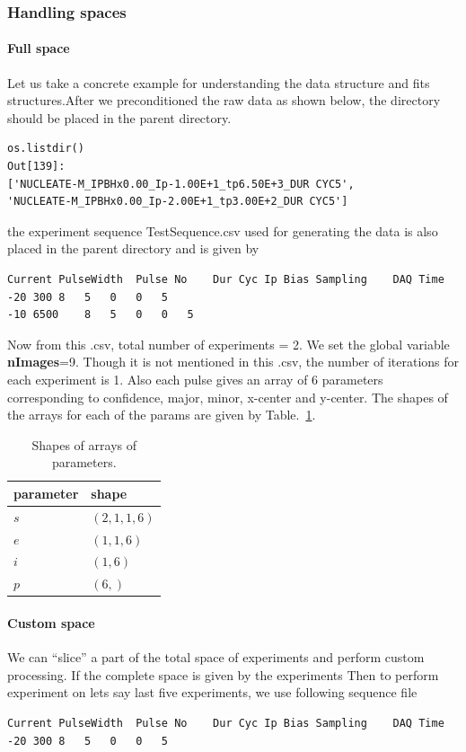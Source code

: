 \documentclass[12pt, twoside, a4paper]{article}
\begin{document}
\subsubsection{Handling spaces}
\paragraph{Full space}
Let us take a concrete example for understanding the data structure and fits structures.After we preconditioned the raw data as shown below, the directory should be placed in the parent directory.
%
\begin{verbatim}
os.listdir()
Out[139]: 
['NUCLEATE-M_IPBHx0.00_Ip-1.00E+1_tp6.50E+3_DUR CYC5',
'NUCLEATE-M_IPBHx0.00_Ip-2.00E+1_tp3.00E+2_DUR CYC5']
\end{verbatim}
%
the experiment sequence TestSequence.csv used for generating the data is also placed in the parent directory and is given by
\begin{verbatim}
Current	PulseWidth	Pulse No	Dur Cyc	Ip Bias	Sampling	DAQ Time
-20	300	8	5	0	0	5
-10	6500	8	5	0	0	5
\end{verbatim}
%
Now from this .csv, total number of experiments = 2. We set the global variable \textbf{nImages}=9. Though it is not mentioned in this .csv, the number of iterations for each experiment is 1. Also each pulse gives an array of 6 parameters corresponding to confidence, major, minor, x-center and y-center. The shapes of the arrays for each of the params are given by Table.~\ref{table: shape of arrays of parameters}.

%
\begin{table}[!htbp]
	\centering
	\begin{tabular}{ll}
		\hline\hline
		parameter	&	 shape	 \\
		\hline
		$s$		&	$(2,1,1,6)$	\\
		$e$		& 	$(1,1,6)$ 	\\
		$i$		&	$(1, 6)$			\\
		$p$		&	$(6,)$				\\
		\hline\hline
	\end{tabular}
	\caption{Shapes of arrays of parameters.}
	\label{table: shape of arrays of parameters}
\end{table}


\paragraph{Custom space}
We can ``slice'' a part of the total space of experiments and perform custom processing. If the complete space is given by the experiments
Then to perform experiment on lets say last five experiments, we use following sequence file
\begin{verbatim}
Current	PulseWidth	Pulse No	Dur Cyc	Ip Bias	Sampling	DAQ Time
-20	300	8	5	0	0	5
\end{verbatim}
%
\end{document}
